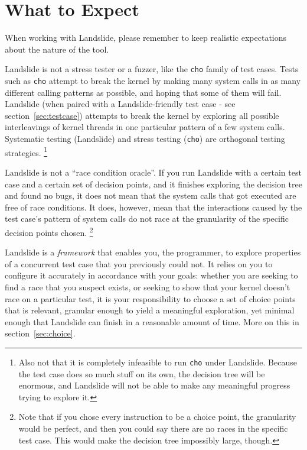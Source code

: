 \documentclass{article}
\begin{document}
\section{What to Expect}

When working with Landslide, please remember to keep realistic expectations about the nature of the tool.

Landslide is not a stress tester or a fuzzer, like the \texttt{cho} family of test cases.
Tests such as \texttt{cho} attempt to break the kernel by making many system calls in as many different calling patterns as possible, and hoping that some of them will fail.
Landslide (when paired with a Landslide-friendly test case - see section~\ref{sec:testcase}) attempts to break the kernel by exploring all possible interleavings of kernel threads in one particular pattern of a few system calls.
Systematic testing (Landslide) and stress testing (\texttt{cho}) are orthogonal testing strategies.
\footnote{Also not that it is completely infeasible to run \texttt{cho} under Landslide. Because the test case does so much stuff on its own, the decision tree will be enormous, and Landslide will not be able to make any meaningful progress trying to explore it.}

Landslide is not a ``race condition oracle''. If you run Landslide with a certain test case and a certain set of decision points, and it finishes exploring the decision tree and found no bugs, it does not mean that the system calls that got executed are free of race conditions.
It does, however, mean that the interactions caused by the test case's pattern of system calls do not race at the granularity of the specific decision points chosen.
\footnote{Note that if you chose every instruction to be a choice point, the granularity would be perfect, and then you could say there are no races in the specific test case. This would make the decision tree impossibly large, though.}

Landslide is a {\em framework} that enables you, the programmer, to explore properties of a concurrent test case that you previously could not. It relies on you to configure it accurately in accordance with your goals: whether you are seeking to find a race that you suspect exists, or seeking to show that your kernel doesn't race on a particular test, it is your responsibility to choose a set of choice points that is relevant, granular enough to yield a meaningful exploration, yet minimal enough that Landslide can finish in a reasonable amount of time. More on this in section~\ref{sec:choice}.
\end{document}
